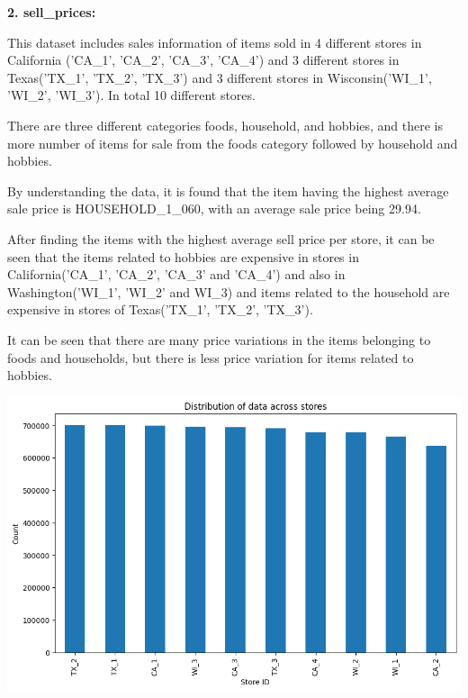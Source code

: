 \documentclass[fleqn,10pt]{SelfArx} %
\begin{document}
\item \textbf{2. sell\_prices:}
\item This dataset includes sales information of items sold in 4 different stores in California ('CA\_1', 'CA\_2', 'CA\_3', 'CA\_4') and 3 different stores in Texas('TX\_1', 'TX\_2', 'TX\_3') and 3 different stores in Wisconsin('WI\_1', 'WI\_2', 'WI\_3'). In total 10 different stores.
\item There are three different categories foods, household, and hobbies, and there is more number of items for sale from the foods category followed by household and hobbies.
\item By understanding the data, it is found that the item having the highest average sale price is HOUSEHOLD\_1\_060, with an average sale price being 29.94.
\item After finding the items with the highest average sell price per store, it can be seen that the items related to hobbies are expensive in stores in California('CA\_1', 'CA\_2', 'CA\_3' and 'CA\_4') and also in Washington('WI\_1', 'WI\_2' and WI\_3) and items related to the household are expensive in stores of Texas('TX\_1', 'TX\_2', 'TX\_3').
\item It can be seen that there are many price variations in the items belonging to foods and households, but there is less price variation for items related to hobbies.

\includegraphics[scale=0.4]{21.png}
\end{document}
